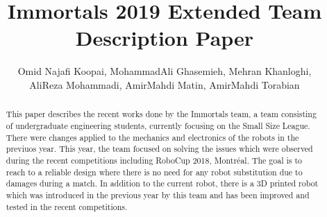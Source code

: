 \documentclass[runningheads,a4paper]{llncs}
\title{Immortals 2019 Extended Team Description Paper}
\author{\normalsize Omid Najafi Koopai{\textsupsub{\small\texttt{1}}{}}, 
MohammadAli Ghasemieh{\textsupsub{\small\texttt{2}}{}}, 
Mehran Khanloghi{\textsupsub{\small\texttt{3}}{}}, \\
\normalsize AliReza Mohammadi{\textsupsub{\small\texttt{3}}{}}, 
AmirMahdi Matin{\textsupsub{\small\texttt{3}}{}},
AmirMahdi Torabian{\textsupsub{\small\texttt{4}}{}}
}
\institute{Sharif University of Technology, \\
\texttt{http://devoted-web-site.url}}
\begin{document}
\maketitle


%
%

\begin{abstract}
This paper describes the recent works done by the Immortals team, a team consisting of undergraduate engineering students, currently focusing on the Small Size League. There were changes applied to the mechanics and electronics of the robots in the previuos year. This year, the team focused on solving the issues which were observed during the recent competitions including RoboCup 2018, Montréal. The goal is to reach to a reliable design where there is no need for any robot substitution due to damages during a match. In addition to the current robot, there is a 3D printed robot which was introduced in the previous year by this team and has been improved and tested in the recent competitions.

\end{abstract}


\justify
\end{document}
